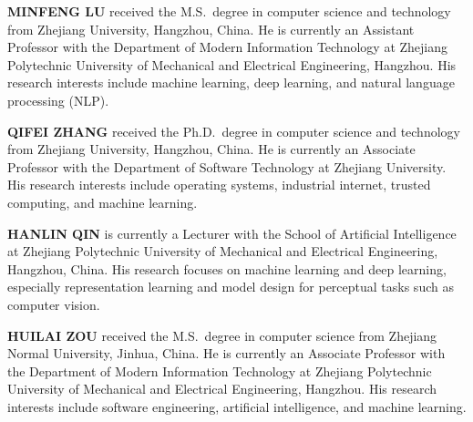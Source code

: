 \documentclass[a4paper,fleqn]{cas-dc}
\begin{document}
{}
\textbf{MINFENG LU} received the M.S.\ degree in computer science and technology from Zhejiang University, Hangzhou, China.
He is currently an Assistant Professor with the Department of Modern Information Technology at Zhejiang Polytechnic University of Mechanical and Electrical Engineering, Hangzhou.
His research interests include machine learning, deep learning, and natural language processing (NLP).
\endbio

\textbf{QIFEI ZHANG} received the Ph.D.\ degree in computer science and technology from Zhejiang University, Hangzhou, China.
He is currently an Associate Professor with the Department of Software Technology at Zhejiang University.
His research interests include operating systems, industrial internet, trusted computing, and machine learning.
\endbio

\textbf{HANLIN QIN} is currently a Lecturer with the School of Artificial Intelligence at Zhejiang Polytechnic University of Mechanical and Electrical Engineering, Hangzhou, China.
His research focuses on machine learning and deep learning, especially representation learning and model design for perceptual tasks such as computer vision.
\endbio


\textbf{HUILAI ZOU} received the M.S.\ degree in computer science from Zhejiang Normal University, Jinhua, China.
He is currently an Associate Professor with the Department of Modern Information Technology at Zhejiang Polytechnic University of Mechanical and Electrical Engineering, Hangzhou.
His research interests include software engineering, artificial intelligence, and machine learning.
\endbio
\end{document}
